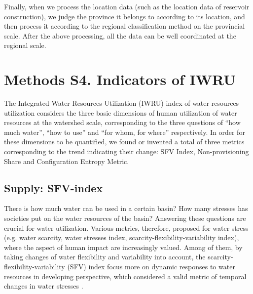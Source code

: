\documentclass[9pt,twoside,lineno]{pnas-new}
\begin{document}
Finally, when we process the location data (such as the location data of reservoir construction), we judge the province it belongs to according to its location, and then process it according to the regional classification method on the provincial scale. After the above processing, all the data can be well coordinated at the regional scale.

\newpage
\section*{Methods S4. Indicators of IWRU}
The Integrated Water Resources Utilization (IWRU) index of water resources utilization considers the three basic dimensions of human utilization of water resources at the watershed scale, corresponding to the three questions of ``how much water'', ``how to use'' and ``for whom, for where'' respectively. 
In order for these dimensions to be quantified, we found or invented a total of three metrics corresponding to the trend indicating their change: SFV Index, Non-provisioning Share and Configuration Entropy Metric.

\subsection*{Supply: SFV-index}
	There is how much water can be used in a certain basin? How many stresses has societies put on the water resources of the basin? Answering these questions are crucial for water utilization. Various metrics, therefore, proposed for water stress (e.g. water scarcity, water stresses index, scarcity-flexibility-variability index), where the aspect of human impact are increasingly valued.
    Among of them, by taking changes of water flexibility and variability into account,	the scarcity-flexibility-variability (SFV) index focus more on dynamic responses to water resources in developing perspective, which considered a valid metric of temporal changes in water stresses \cite{qinFlexibilityIntensityGlobal2019}.
    
\end{document}
